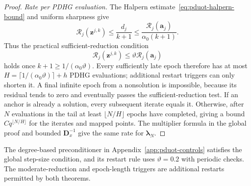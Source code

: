 \begin{proof}
\par\smallskip\noindent\textit{Rate per PDHG evaluation.}
The Halpern estimate~\eqref{eq:pduot-halpern-bound} and uniform sharpness give
\begin{equation*}
\mathcal R_j(\mathbf z^{j,k})\leq\frac{d_j}{k+1}\leq\frac{\mathcal R_j(\mathbf a_j)}{\alpha_0(k+1)}.
\end{equation*}
Thus the practical sufficient-reduction condition
\begin{equation*}
\mathcal R_j(\mathbf z^{j,k})\leq\vartheta\mathcal R_j(\mathbf a_j)
\end{equation*}
holds once $k+1\geq1/(\alpha_0\vartheta)$.
Every sufficiently late epoch therefore has at most $H=\lceil1/(\alpha_0\vartheta)\rceil+h$ PDHG evaluations; additional restart triggers can only shorten it.
A final infinite epoch from a nonsolution is impossible, because its residual tends to zero and eventually passes the sufficient-reduction test.
If an anchor is already a solution, every subsequent iterate equals it.
Otherwise, after $N$ evaluations in the tail at least $\lfloor N/H\rfloor$ epochs have completed, giving a bound $Cq^{\lfloor N/H\rfloor}$ for the iterates and mapped points.
The multiplier formula in the global proof and bounded $\mathbf D_x^{-1}$ give the same rate for $\boldsymbol\lambda_N$.
\end{proof}

The degree-based preconditioner in Appendix~\ref{app:pduot-controls} satisfies the global step-size condition, and its restart rule uses $\vartheta=0.2$ with periodic checks.
The moderate-reduction and epoch-length triggers are additional restarts permitted by both theorems.
